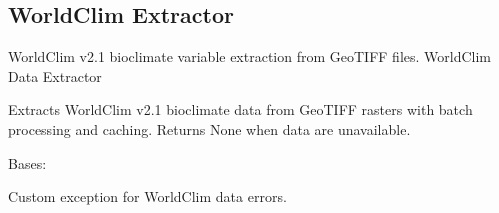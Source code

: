 \documentclass[letterpaper,10pt,english]{sphinxmanual}
\begin{document}
\subsection{WorldClim Extractor}
\label{\detokenize{api_reference:worldclim-extractor}}
\sphinxAtStartPar
WorldClim v2.1 bioclimate variable extraction from GeoTIFF files.
\label{\detokenize{api_reference:module-app.services.worldclim_extractor}}
\sphinxAtStartPar
WorldClim Data Extractor

\sphinxAtStartPar
Extracts WorldClim v2.1 bioclimate data from GeoTIFF rasters with batch processing
and caching. Returns None when data are unavailable.

\begin{fulllineitems}
\label{\detokenize{api_reference:app.services.worldclim_extractor.WorldClimDataError}}
\pysigstartsignatures
\pysigline
{}
\pysigstopsignatures
\sphinxAtStartPar
Bases: 

\sphinxAtStartPar
Custom exception for WorldClim data errors.

\end{fulllineitems}

\end{document}
